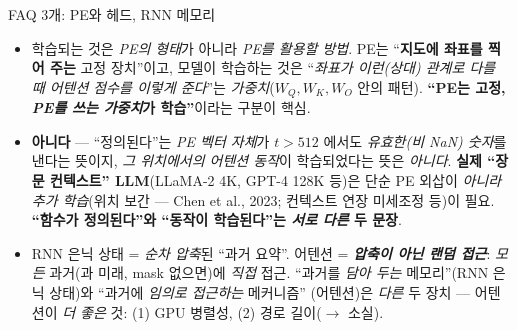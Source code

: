 \begin{frame}{FAQ 3개: PE와 헤드, RNN 메모리}
  \begin{itemize}
    \item {} 학습되는 것은 \emph{PE의 형태}가 아니라
      \emph{PE를 \emph{활용}할 방법}. PE는 ``\textbf{지도에
      좌표를 찍어 주는} 고정 장치''이고, 모델이 학습하는 것은
      ``\emph{좌표가 이런(상대) 관계로 다를 때 어텐션 점수를
      이렇게 준다}''는 \emph{가중치}($W_Q, W_K, W_O$ 안의
      패턴). \textbf{``PE는 고정, \emph{PE를 쓰는 가중치}가
      학습''}이라는 구분이 핵심.
    \item {}
      \textbf{아니다} — ``정의된다''는 \emph{PE 벡터 자체}가
      $t>512$ 에서도 \emph{유효한(비 NaN) 숫자}를 낸다는 뜻이지,
      \emph{그 위치에서의 어텐션 동작}이 학습되었다는 뜻은
      \emph{아니다}. \textbf{실제 ``장문 컨텍스트'' LLM}(LLaMA-2
      4K, GPT-4 128K 등)은 단순 PE 외삽이 \emph{아니라}
      \emph{추가 학습}(위치 보간 — Chen et al., 2023; 컨텍스트
      연장 미세조정 등)이 필요. \textbf{``함수가 정의된다''와
      ``동작이 학습된다''는 \emph{서로 다른} 두 문장}.
    \item {}
      RNN 은닉 상태 = \emph{순차 압축}된 ``과거 요약''.
      어텐션 = \emph{\textbf{압축이 아닌 랜덤 접근}}:
      \emph{모든} 과거(과 미래, mask 없으면)에 \emph{직접}
      접근. ``과거를 \emph{담아 두는} 메모리''(RNN 은닉
      상태)와 ``과거에 \emph{임의로 접근하는} 메커니즘''
      (어텐션)은 \emph{다른} 두 장치 — 어텐션이 \emph{더 좋은}
      것: (1) GPU 병렬성, (2) 경로 길이($\to$ 소실).
  \end{itemize}
\end{frame}
